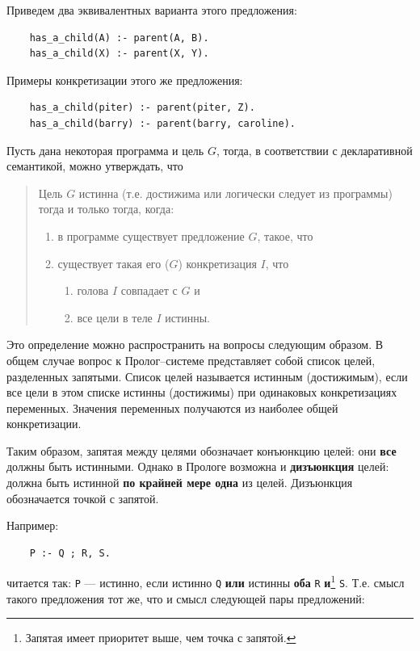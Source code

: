 \documentclass[12pt, openany, twoside]{book} %
\begin{document}
\noindent Приведем два эквивалентных варианта этого предложения:
{\tt\begin{verbatim}
    has_a_child(А) :- parent(А, В).
    has_a_child(X) :- parent(X, Y).
\end{verbatim}}

\noindent Примеры конкретизации этого же предложения:
{\tt\begin{verbatim}
    has_a_child(piter) :- parent(piter, Z).
    has_a_child(barry) :- parent(barry, caroline).
\end{verbatim}}

\noindent Пусть дана некоторая программа и цель $G$, тогда, в соответствии с декларативной семантикой, можно утверждать, что

\begin{quote}
\noindent Цель $G$ истинна (т.е. достижима или логически следует из программы) тогда и только тогда, когда:
\begin{enumerate}
    \item[(1)] в программе существует предложение $G$, такое, что
    \item[(2)] существует такая его ($G$) конкретизация $I$, что
    \begin{enumerate}
        \item[(а)] голова $I$ совпадает с $G$ и
        \item[(б)] все цели в теле $I$ истинны.
    \end{enumerate}
\end{enumerate}
\end{quote}

Это определение можно распространить на вопросы следующим образом. В общем случае вопрос к Пролог--системе представляет собой список целей, разделенных запятыми. Список целей называется истинным (достижимым), если все цели в этом списке истинны (достижимы) при одинаковых конкретизациях переменных. Значения переменных получаются из наиболее общей конкретизации.

Таким образом, запятая между целями обозначает конъюнкцию целей: они \textbf{все} должны быть истинными. Однако в Прологе возможна и \textbf{дизъюнкция} целей: должна быть истинной \textbf{по крайней мере одна} из целей. Дизъюнкция обозначается точкой с запятой.

Например:
{\tt\begin{verbatim}
    Р :- Q ; R, S.
\end{verbatim}}
\noindent читается так: {\tt Р} --- истинно, если истинно {\tt Q} \textbf{или} истинны {\bf оба} {\tt R} {\bf и}\footnote{Запятая имеет приоритет выше, чем точка с запятой.} {\tt S}. Т.е. смысл такого предложения тот же, что и смысл следующей пары предложений:
\end{document}
